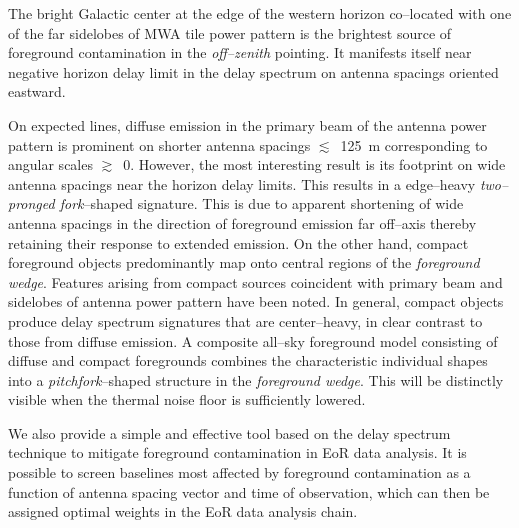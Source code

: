 \documentclass[preprint2,iop,numberedappendix]{emulateapj}
\begin{document}
The bright Galactic center at the edge of the western horizon co--located with one of the far sidelobes of MWA tile power pattern is the brightest source of foreground contamination in the {\it off--zenith} pointing. It manifests itself near negative horizon delay limit in the delay spectrum on antenna spacings oriented eastward. 

On expected lines, diffuse emission in the primary beam of the antenna power pattern is prominent on shorter antenna spacings $\lesssim$~125~m corresponding to angular scales $\gtrsim$~0. However, the most interesting result is its footprint on wide antenna spacings near the horizon delay limits. This results in a edge--heavy {\it two--pronged fork}--shaped signature. This is due to apparent shortening of wide antenna spacings in the direction of foreground emission far off--axis thereby retaining their response to extended emission. On the other hand, compact foreground objects predominantly map onto central regions of the {\it foreground wedge}. Features arising from compact sources coincident with primary beam and sidelobes of antenna power pattern have been noted. In general, compact objects produce delay spectrum signatures that are center--heavy, in clear contrast to those from diffuse emission. A composite all--sky foreground model consisting of diffuse and compact foregrounds combines the characteristic individual shapes into a {\it pitchfork}--shaped structure in the {\it foreground wedge}. This will be distinctly visible when the thermal noise floor is sufficiently lowered. 

We also provide a simple and effective tool based on the delay spectrum technique to mitigate foreground contamination in EoR data analysis. It is possible to screen baselines most affected by foreground contamination as a function of antenna spacing vector and time of observation, which can then be assigned optimal weights in the EoR data analysis chain.

\acknowledgments
\end{document}
